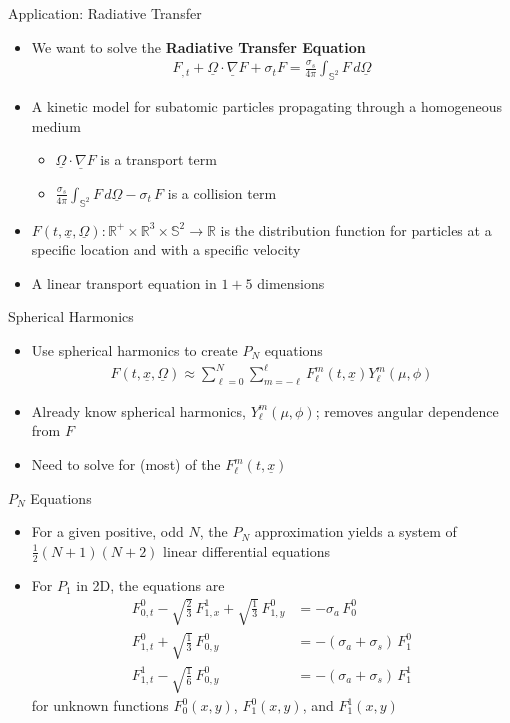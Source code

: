 \documentclass{beamer}
\newcommand{\bunderline}[1]{\underline{#1}}
\renewcommand{\vec}[1]{{\bunderline{#1}}}
\begin{document}
\begin{frame}{Application: Radiative Transfer}
	\begin{itemize}
		\item 
			We want to solve the \textbf{Radiative Transfer Equation}
		\begin{align*}
			F_{,t} + \vec{\Omega} \cdot \vec{\nabla}F + \sigma_t F = \frac{\sigma_s}{4\pi}\int_{\mathbb{S}^2}F\, d\vec{\Omega}
		\end{align*}
		\item
			A kinetic model for subatomic particles propagating through a homogeneous medium
		\begin{itemize}
			\item $\vec{\Omega} \cdot \vec{\nabla}F$ is a transport term
			\item $ \frac{\sigma_s}{4\pi}\int_{\mathbb{S}^2}F\, d\vec{\Omega} - \sigma_t\,F$ is a collision term
		\end{itemize}
		\item
			$F(t, \vec{x}, \vec{\Omega}) : \mathbb{R}^+ \times \mathbb{R}^3 \times \mathbb{S}^2 \to \mathbb{R}$ is the distribution function for particles at a specific location and with a specific velocity
		\item
			A linear transport equation in $1 + 5$ dimensions
	\end{itemize}
\end{frame}

\begin{frame}{Spherical Harmonics}
	\begin{itemize}
		\item
			Use spherical harmonics to create $P_N$ equations
		\begin{align*}
		F(t, \vec{x}, \vec{\Omega}) \approx \sum_{\ell = 0}^N \sum_{m=-\ell}^\ell F_\ell^m(t, \vec{x})Y_\ell^m(\mu, \phi)
		\end{align*}	
		\item 
			Already know spherical harmonics, $Y_\ell^m(\mu, \phi)$; removes angular dependence from $F$
		\item
			Need to solve for (most) of the $F_\ell^m(t, \vec{x})$
	\end{itemize}
\end{frame}
\begin{frame}{$P_N$ Equations}
	\begin{itemize}
		\item
		For a given positive, odd $N$, the $P_N$ approximation yields a system of $\frac{1}{2}(N+1)(N+2)$ linear differential equations
		\item
		For $P_1$ in 2D, the equations are
		\begin{align*}
		F_{0,t}^0 - \sqrt{\frac{2}{3}}\,F_{1,x}^1 + \sqrt{\frac{1}{3}}\,F_{1,y}^0 & = -\sigma_a\,F_0^0 \\
		F_{1,t}^0 + \sqrt{\frac{1}{3}}\,F_{0,y}^0 & = -(\sigma_a + \sigma_s)\,F_1^0 \\
		F_{1,t}^1 - \sqrt{\frac{1}{6}}\,F_{0,y}^0 & = -(\sigma_a + \sigma_s)\,F_1^1
		\end{align*}
		for unknown functions $F_0^0(x, y)$, $F_1^0(x, y)$, and $F_1^1(x, y)$
	\end{itemize}
\end{frame}
\end{document}
